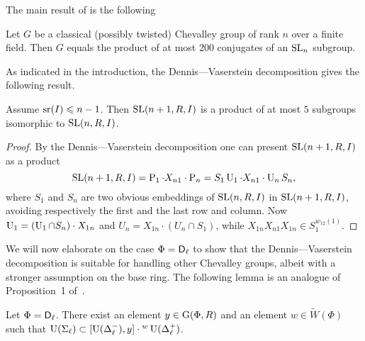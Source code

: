 The main result of \cite{NikProdDecomp} is the following
\begin{thm*}
Let $G$ be a classical (possibly twisted) Chevalley group of rank $n$ over a finite field. Then $G$ equals the product of at most $200$ conjugates of an $\operatorname{SL}_n$ subgroup.
\end{thm*}
As indicated in the introduction, the Dennis---Vaserstein decomposition gives the following result.
\begin{lemma}
Assume $\operatorname{sr}(I)\leqslant n-1$. Then $\operatorname{SL}(n+1,R,I)$ is a product of at most $5$ subgroups isomorphic to $\operatorname{SL}(n,R,I)$.
\end{lemma}
\begin{proof}
By the Dennis---Vaserstein decomposition one can present $\operatorname{SL}(n+1,R,I)$ as a product
\[ \operatorname{SL}(n+1,R,I) =  \operatorname{P}_1\cdot X_{n1}\cdot\operatorname{P}_n=S_1\operatorname{U}_1\cdot X_{n1}\cdot\operatorname{U}_n S_n, \]
where $S_1$ and $S_n$ are two obvious embeddings of $\operatorname{SL}(n,R,I)$ in $\operatorname{SL}(n+1,R,I)$, avoiding respectively the first and the last row and column. Now $\operatorname{U}_1=(\operatorname{U}_1\cap S_n)\cdot X_{1n}$ and $U_n= X_{1n}\cdot(U_n\cap S_1)$, while $X_{1n}X_{n1}X_{1n}\in S_1^{w_{12}(1)}$.
\end{proof}
We will now elaborate on the case $\Phi=\mathsf{D}_\ell$ to show that the Dennis---Vaserstein decomposition is suitable for handling other Chevalley groups, albeit with a stronger assumption on the base ring. The following lemma is an analogue of Proposition~1 of~\cite{NikProdDecomp}.
\begin{lemma}
Let $\Phi=\mathsf{D}_\ell$. There exist an element $y\in\operatorname{G}(\Phi,R)$ and an element $w\in\widetilde{W}(\Phi)$ such that $\operatorname{U}(\Sigma_\ell)\subset[\operatorname{U}(\Delta_\ell^-),y]\cdot{}^w\operatorname{U}(\Delta_\ell^+)$.
\end{lemma}

